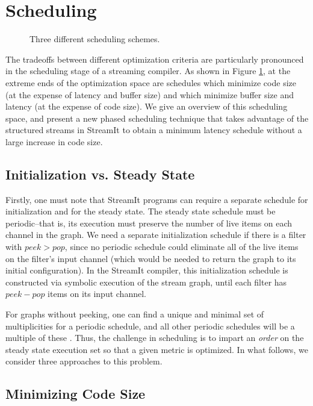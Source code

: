 \section{Scheduling}

\begin{figure}
\centering
{}
\caption{Three different scheduling schemes.}
\label{fig:sched}
\end{figure}

The tradeoffs between different optimization criteria are particularly
pronounced in the scheduling stage of a streaming compiler.  As shown
in Figure \ref{fig:sched}, at the extreme ends of the optimization
space are schedules which minimize code size (at the expense of
latency and buffer size) and which minimize buffer size and latency
(at the expense of code size).  We give an overview of this scheduling
space, and present a new phased scheduling technique that takes
advantage of the structured streams in StreamIt to obtain a minimum
latency schedule without a large increase in code size.

\subsection{Initialization vs. Steady State}

Firstly, one must note that StreamIt programs can require a separate
schedule for initialization and for the steady state.  The steady
state schedule must be periodic--that is, its execution must preserve
the number of live items on each channel in the graph.  We need a
separate initialization schedule if there is a filter with $peek >
pop$, since no periodic schedule could eliminate all of the live items
on the filter's input channel (which would be needed to return the
graph to its initial configuration).  In the StreamIt compiler, this
initialization schedule is constructed via symbolic execution of the
stream graph, until each filter has $peek-pop$ items on its input
channel.

For graphs without peeking, one can find a unique and minimal set of
multiplicities for a periodic schedule, and all other periodic
schedules will be a multiple of these \cite{leesdf}.  Thus, the
challenge in scheduling is to impart an {\it order} on the steady
state execution set so that a given metric is optimized.  In what
follows, we consider three approaches to this problem.

\subsection{Minimizing Code Size}

